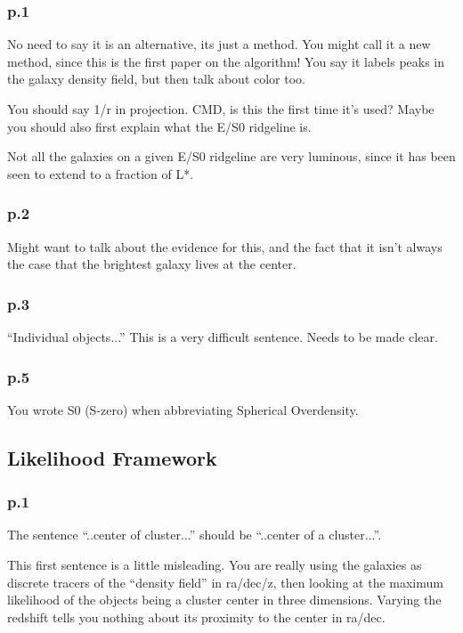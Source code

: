 \documentclass[12pt]{article}
\begin{document}
\subsubsection*{p.1}

No need to say it is an alternative, its just a method.  You might call
it a new method, since this is the first paper on the algorithm! You say
it labels peaks in the galaxy density field, but then talk about color too.

You should say 1/r in projection.  CMD, is this the first time it's used?
Maybe you should also first explain what the E/S0 ridgeline is. 

Not all the galaxies on a given E/S0 ridgeline are very luminous, since it has
been seen to extend to a fraction of L*.

\subsubsection*{p.2}

Might want to talk about the evidence for this, and the fact that it isn't
always the case that the brightest galaxy lives at the center.

\subsubsection*{p.3}

``Individual objects...''  This is a very difficult sentence.  Needs to
be made clear.

\subsubsection*{p.5}

You wrote S0 (S-zero) when abbreviating Spherical Overdensity.

\subsection{Likelihood Framework}

\subsubsection*{p.1}

The sentence ``..center of cluster...'' should be ``..center of a cluster...''.

This first sentence is a little misleading.  You are really using the galaxies
as discrete tracers of the ``density field'' in ra/dec/z, then looking at the
maximum likelihood of the objects being a cluster center in three dimensions.
Varying the redshift tells you nothing about its proximity to the center
in ra/dec.
\end{document}
